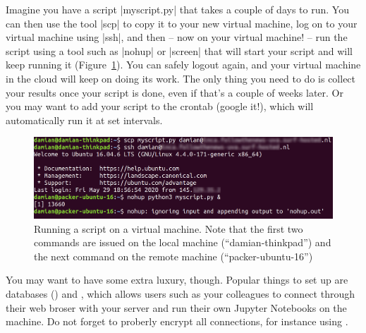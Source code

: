 Imagine you have a script |myscript.py| that takes a couple of days to
run. You can then use the tool |scp| to copy it to your new virtual
machine, log on to your virtual machine using |ssh|, and then -- now
on your virtual machine! -- run the script using a tool such as
|nohup| or |screen| that will start your script and will keep running
it (Figure~\ref{fig:ssh}). You can safely logout again, and your
virtual machine in the cloud will keep on doing its work. The only
thing you need to do is collect your results once your script is done,
even if that's a couple of weeks later. Or you may want to add your
script to the crontab (google it!), which will automatically run
it at set intervals.

\begin{figure}[!tbp]
  \centering
  \includegraphics[width=\textwidth]{figures/ssh.png}
  \caption{Running a script on a virtual machine\label{fig:ssh}. Note that the first two commands are issued on the local machine (``damian-thinkpad'') and the next command on the remote machine (``packer-ubuntu-16'')}
\end{figure}

You may want to have some extra luxury, though. Popular things to
set up are databases () and , which
allows users such as your colleagues to connect through their
web broser with your server and run their own Jupyter Notebooks
on the machine. Do not forget to proberly encrypt all connections,
for instance using .
